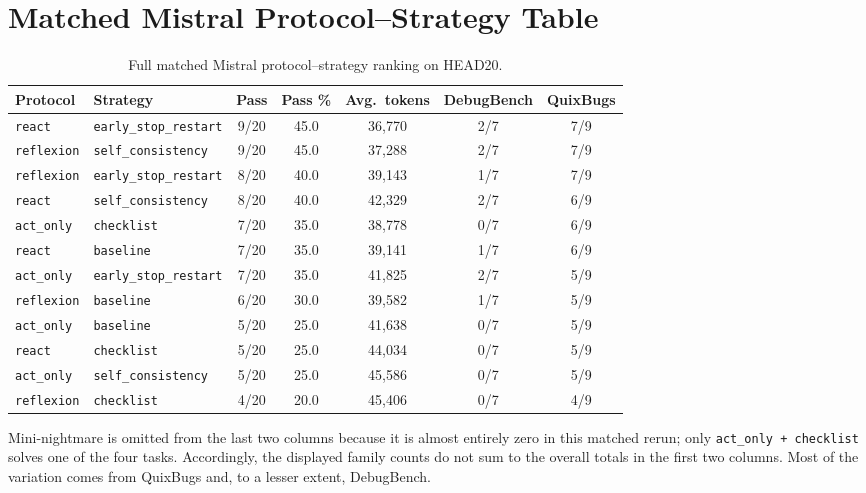 \documentclass{article}
\begin{document}
\section{Matched Mistral Protocol--Strategy Table}

\begin{table}[H]
\centering
\caption{Full matched Mistral protocol--strategy ranking on HEAD20.}
\label{tab:fullprotocols}
\begin{tabular}{llccccc}
\toprule
Protocol & Strategy & Pass & Pass \% & Avg.\ tokens & DebugBench & QuixBugs \\
\midrule
\texttt{react} & \texttt{early\_stop\_restart} & 9/20 & 45.0 & 36{,}770 & 2/7 & 7/9 \\
\texttt{reflexion} & \texttt{self\_consistency} & 9/20 & 45.0 & 37{,}288 & 2/7 & 7/9 \\
\texttt{reflexion} & \texttt{early\_stop\_restart} & 8/20 & 40.0 & 39{,}143 & 1/7 & 7/9 \\
\texttt{react} & \texttt{self\_consistency} & 8/20 & 40.0 & 42{,}329 & 2/7 & 6/9 \\
\texttt{act\_only} & \texttt{checklist} & 7/20 & 35.0 & 38{,}778 & 0/7 & 6/9 \\
\texttt{react} & \texttt{baseline} & 7/20 & 35.0 & 39{,}141 & 1/7 & 6/9 \\
\texttt{act\_only} & \texttt{early\_stop\_restart} & 7/20 & 35.0 & 41{,}825 & 2/7 & 5/9 \\
\texttt{reflexion} & \texttt{baseline} & 6/20 & 30.0 & 39{,}582 & 1/7 & 5/9 \\
\texttt{act\_only} & \texttt{baseline} & 5/20 & 25.0 & 41{,}638 & 0/7 & 5/9 \\
\texttt{react} & \texttt{checklist} & 5/20 & 25.0 & 44{,}034 & 0/7 & 5/9 \\
\texttt{act\_only} & \texttt{self\_consistency} & 5/20 & 25.0 & 45{,}586 & 0/7 & 5/9 \\
\texttt{reflexion} & \texttt{checklist} & 4/20 & 20.0 & 45{,}406 & 0/7 & 4/9 \\
\bottomrule
\end{tabular}
\end{table}

Mini-nightmare is omitted from the last two columns because it is almost entirely zero in this matched rerun; only \texttt{act\_only + checklist} solves one of the four tasks. Accordingly, the displayed family counts do not sum to the overall totals in the first two columns. Most of the variation comes from QuixBugs and, to a lesser extent, DebugBench.
\end{document}

